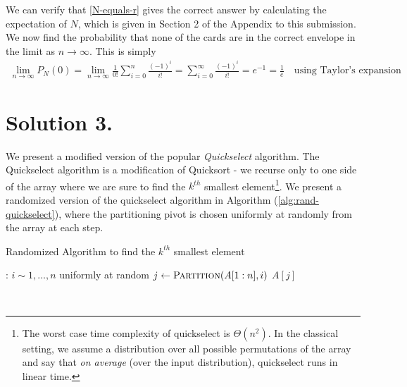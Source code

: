 \documentclass[9pt]{article}
\begin{document}
We can verify that \eqref{N-equals-r} gives the correct answer by calculating the expectation of $N$, which is given in Section 2
of the Appendix to this submission.
We now find the probability that none of the cards are in the correct envelope in the limit
as $n \to \infty$. This is simply
\begin{equation}
    \label{n-equals-0-n-to-infty}
    \begin{split}
        \lim_{n \to \infty} P_{N}(0) = \lim_{n \to \infty} \frac{1}{0!} \sum_{i=0}^{n} \frac{(-1)^{i}}{i!}
        = \sum_{i=0}^{\infty} \frac{(-1)^{i}}{i!} = e^{-1} = \frac{1}{e}
        \quad \text{using Taylor's expansion}
    \end{split}
\end{equation}

\section*{\textbf{Solution 3.}}
We present a modified version of the popular \textit{Quickselect} algorithm. The
Quickselect algorithm is a modification of Quicksort - we recurse only to one
side of the array where we are sure to find the $k^{th}$ smallest element\footnote{
The worst case time complexity of quickselect is $\Theta(n^{2})$. In the classical
setting, we assume a distribution over all possible permutations of the array and say
that \textit{on average} (over the input distribution), quickselect runs in linear
time.}.
We present a randomized version of the quickselect algorithm in Algorithm (\ref{alg:rand-quickselect}), where the partitioning pivot is chosen uniformly at
randomly from the array at each step.
\begin{algorithm}
    \caption{Randomized Algorithm to find the $k^{th}$ smallest element}
    \label{alg:rand-quickselect}
    \begin{algorithmic}[1]
        :
            \State $i \sim 1, \dots, n$ uniformly at random
            \State $j \gets \textsc{Partition}(A[1:n], i)$
                \State \Return {}
                \State \Return {}
            \Else
                \State \Return $A[j]$
            \EndIf
        \EndProcedure
    \end{algorithmic}
\end{algorithm}
\vspace*{0pt} \\
\end{document}
